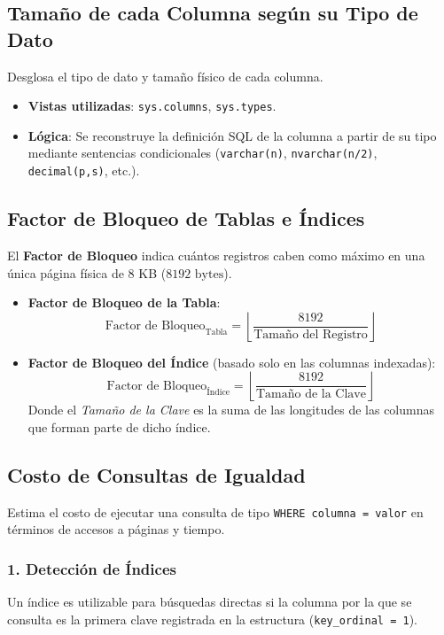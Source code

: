 \documentclass[11pt,a4paper]{article}
\begin{document}
\subsection{Tamaño de cada Columna según su Tipo de Dato}
Desglosa el tipo de dato y tamaño físico de cada columna.
\begin{itemize}
    \item \textbf{Vistas utilizadas}: \texttt{sys.columns}, \texttt{sys.types}.
    \item \textbf{Lógica}: Se reconstruye la definición SQL de la columna a partir de su tipo mediante sentencias condicionales (\texttt{varchar(n)}, \texttt{nvarchar(n/2)}, \texttt{decimal(p,s)}, etc.).
\end{itemize}

\subsection{Factor de Bloqueo de Tablas e Índices}
El \textbf{Factor de Bloqueo} indica cuántos registros caben como máximo en una única página física de 8 KB ($8192\text{ bytes}$).
\begin{itemize}
    \item \textbf{Factor de Bloqueo de la Tabla}:
        \begin{equation}
            \text{Factor de Bloqueo}_{\text{Tabla}} = \left\lfloor \frac{8192}{\text{Tamaño del Registro}} \right\rfloor
        \end{equation}
    \item \textbf{Factor de Bloqueo del Índice} (basado solo en las columnas indexadas):
        \begin{equation}
            \text{Factor de Bloqueo}_{\text{Índice}} = \left\lfloor \frac{8192}{\text{Tamaño de la Clave}} \right\rfloor
        \end{equation}
        Donde el \textit{Tamaño de la Clave} es la suma de las longitudes de las columnas que forman parte de dicho índice.
\end{itemize}

\subsection{Costo de Consultas de Igualdad}
Estima el costo de ejecutar una consulta de tipo \texttt{WHERE columna = valor} en términos de accesos a páginas y tiempo.

\subsubsection{1. Detección de Índices}
Un índice es utilizable para búsquedas directas si la columna por la que se consulta es la primera clave registrada en la estructura (\texttt{key\_ordinal = 1}).
\end{document}

